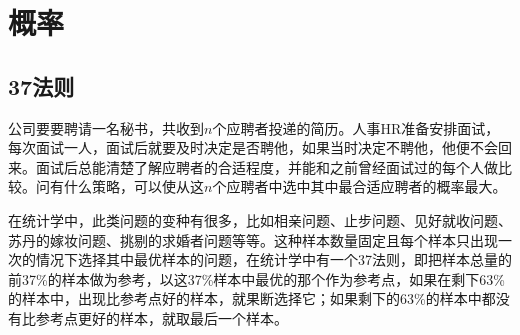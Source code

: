 
\chapter{概率}
\label{chap:probability}

\section{37法则}
\label{sec:37-rule}

\begin{example}
  公司要要聘请一名秘书，共收到$n$个应聘者投递的简历。人事HR准备安排面试，每次面试一人，面试后就要及时决定是否聘他，如果当时决定不聘他，他便不会回来。面试后总能清楚了解应聘者的合适程度，并能和之前曾经面试过的每个人做比较。问有什么策略，可以使从这$n$个应聘者中选中其中最合适应聘者的概率最大。
\end{example}

在统计学中，此类问题的变种有很多，比如相亲问题、止步问题、见好就收问题、苏丹的嫁妆问题、挑剔的求婚者问题等等。这种样本数量固定且每个样本只出现一次的情况下选择其中最优样本的问题，在统计学中有一个37法则，即把样本总量的前37\%的样本做为参考，以这37\%样本中最优的那个作为参考点，如果在剩下63\%的样本中，出现比参考点好的样本，就果断选择它；如果剩下的63\%的样本中都没有比参考点更好的样本，就取最后一个样本。

